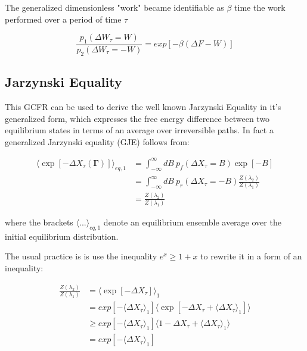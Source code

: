 \documentclass[a4paper,12pt,nofootinbib]{article}
\begin{document}
The generalized dimensionless "work" became identifiable as $\beta$ time the work performed over a period of time $\tau$

\begin{equation}
\label{CFT}
  \frac{p_1(\Delta W_\tau =W)}{p_2(\Delta W_\tau = -W)} = exp[-\beta (\Delta F - W)]
\end{equation}


\subsection{Jarzynski Equality}
This GCFR can be used to derive the well known Jarzynski Equality in it's generalized form, which expresses the free energy difference between two equilibrium states in terms of an average over irreversible paths.
In fact a generalized Jarzynski equality (GJE) follows from:

\begin{equation}
\begin{aligned}
  \langle \exp[-\Delta X_{\tau}(\bm{\Gamma})] \rangle_{eq,1} 
  &= \int_{-\infty}^{\infty} dB\ p_f(\Delta X_\tau =B)\exp[-B]\\
 &= \int_{-\infty}^{\infty} dB\ p_r(\Delta X_\tau =-B)\frac{Z(\lambda_2)}{Z(\lambda_1)}\\
 &=\frac{Z(\lambda_2)}{Z(\lambda_1)}
\end{aligned}
\end{equation}

where the brackets $\langle ... \rangle_{eq,1}$ denote an equilibrium ensemble average over the initial equilibrium distribution.

The usual practice is is use the inequality $e^x \geq 1+x $ to rewrite it in a form of an inequality:

\begin{equation}
\begin{aligned}
  \frac{Z(\lambda_2)}{Z(\lambda_1)} &=\langle \exp[-\Delta X_\tau ]\rangle_1 \\
  &=exp[-\langle\Delta X_\tau \rangle_1]\langle \exp[-\Delta X_\tau + \langle \Delta X_\tau \rangle_1]\rangle \\
  &\geq exp[-\langle\Delta X_\tau \rangle_1]\langle 1- \Delta X_\tau + \langle \Delta X_\tau \rangle_1 \rangle \\
  &=exp[-\langle\Delta X_\tau \rangle_1]
\end{aligned}
\end{equation}
\end{document}
